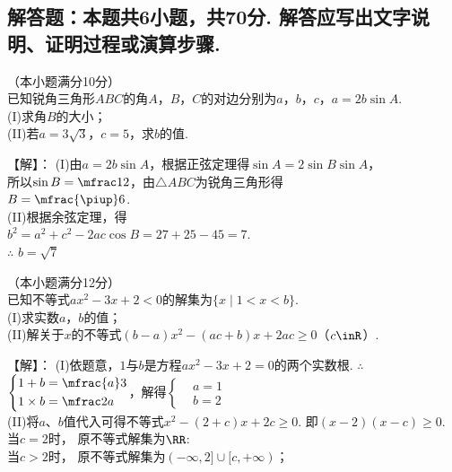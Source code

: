 \begin{exercise}
\section{解答题：本题共6小题，共70分. 解答应写出文字说明、证明过程或演算步骤.}
  \item%
    （本小题满分10分）\\
    已知锐角三角形$ABC$的角$A$，$B$，$C$的对边分别为$a$，$b$，$c$，$a=2b\sin A$.\\
    (I)求角$B$的大小；\\
    (II)若$a=3\sqrt3$，$c=5$，求$b$的值.
    \begin{answer}
      【解】：
      (I)由$a=2b\sin A$，根据正弦定理得$\sin A=2\sin B\sin A$，\\
         所以$\sin B=\mfrac12$，由$\triangle{ABC}$为锐角三角形得\\
         $B=\mfrac{\piup}6$.\\
      (II)根据余弦定理，得\\
          $b^2=a^2+c^2-2ac\cos B=27+25-45=7$.\\
          $\therefore$ $b=\sqrt7$
    \end{answer}
  \clearpage
  \item%
    （本小题满分12分）\\
    已知不等式$ax^2-3x+2<0$的解集为$\{x\mid 1<x<b\}$.\\
    (I)求实数$a$，$b$的值；\\
    (II)解关于$x$的不等式$(b-a)x^2-(ac+b)x+2ac\geqslant0$（$c\inR$）.
    \begin{answer}
      【解】：
      (I)依题意，$1$与$b$是方程$ax^2-3x+2=0$的两个实数根.
         $\therefore$ $\left\{\begin{aligned}
             &1+b=\mfrac{a}3\\
             &1\times b=\mfrac2a
           \end{aligned}\right.$，解得$\left\{\begin{aligned}
               &a=1\\
               &b=2
             \end{aligned}\right.$\\
      (II)将$a$、$b$值代入可得不等式$x^2-(2+c)x+2c\geqslant0$.
         即$(x-2)(x-c)\geqslant0$.\\
         当$c=2$时， 原不等式解集为$\RR$:\\
         当$c>2$时， 原不等式解集为$(-\infty,2]\cup[c,+\infty)$；\\

\end{answer}
\end{exercise}
